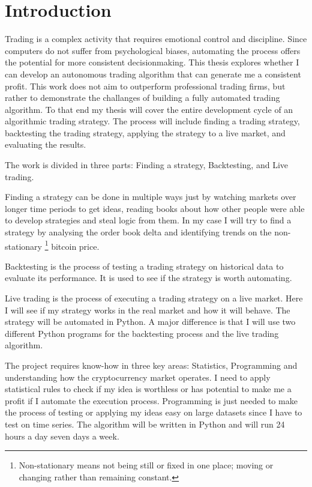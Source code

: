 \documentclass[12pt]{article}
\begin{document}
\section{Introduction}
Trading is a complex activity that requires emotional control and discipline. Since computers do not suffer from psychological biases, automating the process offers the potential for more consistent decisionmaking. This thesis explores whether I can develop an autonomous trading algorithm that can generate me a consistent profit. 
This work does not aim to outperform professional trading firms, but rather to demonstrate the challanges of building a fully automated trading algorithm.
To that end my thesis will cover the entire development cycle of an algorithmic trading strategy. The process will include finding a trading strategy, backtesting the trading strategy, applying the strategy to a live market, and evaluating the results.



The work is divided in three parts: Finding a strategy, Backtesting, and Live trading.

Finding a strategy can be done in multiple ways just by watching markets over longer time periods to get ideas, reading books about how other people were able to develop strategies and steal logic from them. In my case I will try to find a strategy by analysing the order book delta and identifying trends on the non-stationary \footnote{Non-stationary means not being still or fixed in one place; moving or changing rather than remaining constant.} bitcoin price. 

Backtesting is the process of testing a trading strategy on historical data to evaluate its performance. It is used to see if the strategy is worth automating.

Live trading is the process of executing a trading strategy on a live market. Here I will see if my strategy works in the real market and how it will behave. The strategy will be automated in Python. A major difference is that I will use two different Python programs for the backtesting process and the live trading algorithm.  


The project requires know-how in three key areas: Statistics, Programming and understanding how the cryptocurrency market operates. I need to apply statistical rules to check if my idea is worthless or has potential to make me a profit if I automate the execution process. Programming is just needed to make the process of testing or applying my ideas easy on large datasets since I have to test on time series. The algorithm will be written in Python and will run 24 hours a day seven days a week.
\end{document}
